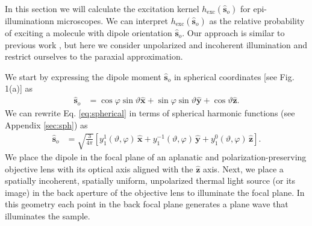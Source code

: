 \documentclass{osa-article}
\providecommand{\so}{\mathbf{\hat{s}}_o}
\providecommand{\mh}[1]{\mathbf{\hat{#1}}}
\begin{document}
In this section we will calculate the excitation kernel $h_{\text{exc}}(\so)$
for epi-illuminationn microscopes. We can interpret $h_{\text{exc}}(\so)$ as the
relative probability of exciting a molecule with dipole orientation $\so$. Our
approach is similar to previous work \cite{fourkas2001, chandler2017}, but here
we consider unpolarized and incoherent illumination and restrict ourselves to
the paraxial approximation.

We start by expressing the dipole moment $\so{}$ in spherical coordinates [see
Fig. 1(a)] as
\begin{align}
  \so{} &= \cos\varphi\sin\vartheta\mh{x} + \sin\varphi\sin\vartheta\mh{y} + \cos\vartheta\mh{z}. \label{eq:spherical}
\end{align}
We can rewrite Eq. \ref{eq:spherical} in terms of spherical harmonic functions
(see Appendix \ref{sec:sph}) as
\begin{align}
  \so{} &=\sqrt{\frac{3}{4\pi}}\left[y_1^1(\vartheta, \varphi)\,\mh{x} + y_1^{-1}(\vartheta, \varphi)\,\mh{y} + y_1^0(\vartheta, \varphi)\, \mh{z}\right]. \label{eq:sphharm}
\end{align}
We place the dipole in the focal plane of an aplanatic and
polarization-preserving objective lens with its optical axis aligned with the
$\mh{z}$ axis. Next, we place a spatially incoherent, spatially uniform,
unpolarized thermal light source (or its image) in the back aperture of the
objective lens to illuminate the focal plane. In this geometry each point in the
back focal plane generates a plane wave that illuminates the sample.
\end{document}

